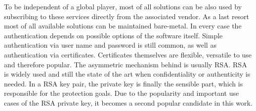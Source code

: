 To be independent of a global player, most of all solutions can be also used by subscribing to these services directly from the associated vendor.
As a last resort most of all available solutions can be maintained bare-metal.
In every case the authentication depends on possible options of the software itself. Simple authentication via user name and password is still common, as well as authentication via certificates.
Certificates themselves are flexible, versatile to use and therefore popular. The asymmetric mechanism behind is usually RSA. RSA is widely used and still the state of the art when confidentiality or authenticity
is needed. In a RSA key pair, the private key is finally the sensible part, which is responsible for the protection goals. 
Due to the popularity and important use cases of the RSA private key, it becomes a second popular candidate in this work.


